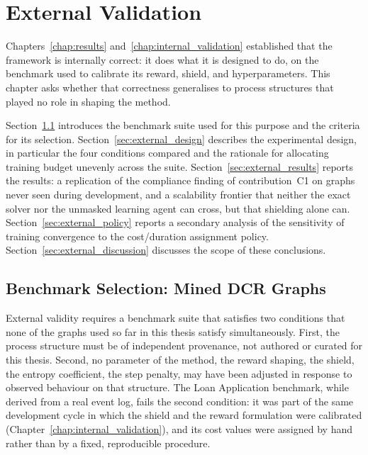 
\chapter{External Validation}
\label{chap:external_validation}

Chapters~\ref{chap:results} and~\ref{chap:internal_validation}
established that the framework is internally correct: it does what it
is designed to do, on the benchmark used to calibrate its reward,
shield, and hyperparameters. This chapter asks whether that correctness
generalises to process structures that played no role in shaping the
method.

Section~\ref{sec:external_benchmark_grid} introduces the benchmark
suite used for this purpose and the criteria for its selection.
Section~\ref{sec:external_design} describes the experimental design,
in particular the four conditions compared and the rationale for
allocating training budget unevenly across the suite.
Section~\ref{sec:external_results} reports the results: a replication
of the compliance finding of contribution~C1 on graphs never seen
during development, and a scalability frontier that neither the exact
solver nor the unmasked learning agent can cross, but that shielding
alone can. Section~\ref{sec:external_policy} reports a secondary
analysis of the sensitivity of training convergence to the
cost/duration assignment policy. Section~\ref{sec:external_discussion}
discusses the scope of these conclusions.

\section{Benchmark Selection: Mined DCR Graphs}
\label{sec:external_benchmark_grid}

External validity requires a benchmark suite that satisfies two
conditions that none of the graphs used so far in this thesis satisfy
simultaneously. First, the process structure must be of independent
provenance, not authored or curated for this thesis. Second, no
parameter of the method, the reward shaping, the shield, the
entropy coefficient, the step penalty, may have been adjusted in
response to observed behaviour on that structure. The Loan Application
benchmark, while derived from a real event log, fails the second
condition: it was part of the same development cycle in which the
shield and the reward formulation were calibrated
(Chapter~\ref{chap:internal_validation}), and its cost values were
assigned by hand rather than by a fixed, reproducible procedure.

